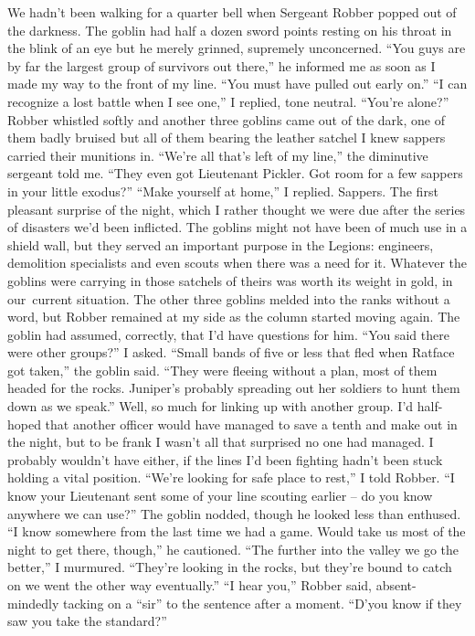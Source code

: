 \documentclass[12pt, openany]{book}
\begin{document}
We hadn’t been walking for a quarter bell when Sergeant Robber popped out of the darkness. The goblin had half a dozen sword points resting on his throat in the blink of an eye but he merely grinned, supremely unconcerned.
“You guys are by far the largest group of survivors out there,” he informed me as soon as I made my way to the front of my line. “You must have pulled out early on.”
“I can recognize a lost battle when I see one,” I replied, tone neutral. “You’re alone?”
Robber whistled softly and another three goblins came out of the dark, one of them badly bruised but all of them bearing the leather satchel I knew sappers carried their munitions in.
“We’re all that’s left of my line,” the diminutive sergeant told me. “They even got Lieutenant Pickler. Got room for a few sappers in your little exodus?”
“Make yourself at home,” I replied.
Sappers. The first pleasant surprise of the night, which I rather thought we were due after the series of disasters we’d been inflicted. The goblins might not have been of much use in a shield wall, but they served an important purpose in the Legions: engineers, demolition specialists and even scouts when there was a need for it. Whatever the goblins were carrying in those satchels of theirs was worth its weight in gold, in our current situation. The other three goblins melded into the ranks without a word, but Robber remained at my side as the column started moving again. The goblin had assumed, correctly, that I’d have questions for him.
“You said there were other groups?” I asked.
“Small bands of five or less that fled when Ratface got taken,” the goblin said. “They were fleeing without a plan, most of them headed for the rocks. Juniper’s probably spreading out her soldiers to hunt them down as we speak.”
Well, so much for linking up with another group. I’d half-hoped that another officer would have managed to save a tenth and make out in the night, but to be frank I wasn’t all that surprised no one had managed. I probably wouldn’t have either, if the lines I’d been fighting hadn’t been stuck holding a vital position.
“We’re looking for safe place to rest,” I told Robber. “I know your Lieutenant sent some of your line scouting earlier – do you know anywhere we can use?”
The goblin nodded, though he looked less than enthused.
“I know somewhere from the last time we had a game. Would take us most of the night to get there, though,” he cautioned.
“The further into the valley we go the better,” I murmured. “They’re looking in the rocks, but they’re bound to catch on we went the other way eventually.”
“I hear you,” Robber said, absent-mindedly tacking on a “sir” to the sentence after a moment. “D’you know if they saw you take the standard?”
\end{document}
